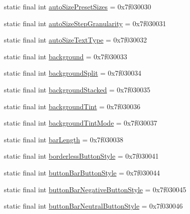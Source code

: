 \begin{DoxyCompactItemize}
\item 
static final int \mbox{\hyperlink{classandroid_1_1support_1_1v7_1_1appcompat_1_1_r_1_1attr_a560a07feaaba74f2673e11a6cd9030bb}{auto\+Size\+Preset\+Sizes}} = 0x7f030030
\item 
static final int \mbox{\hyperlink{classandroid_1_1support_1_1v7_1_1appcompat_1_1_r_1_1attr_a9842951e4e0a0f506950d576ed91a6bc}{auto\+Size\+Step\+Granularity}} = 0x7f030031
\item 
static final int \mbox{\hyperlink{classandroid_1_1support_1_1v7_1_1appcompat_1_1_r_1_1attr_a88e73eda0da576f10347ce50b6cf169e}{auto\+Size\+Text\+Type}} = 0x7f030032
\item 
static final int \mbox{\hyperlink{classandroid_1_1support_1_1v7_1_1appcompat_1_1_r_1_1attr_aa34b0a503c23c24f0398d3e089ef275d}{background}} = 0x7f030033
\item 
static final int \mbox{\hyperlink{classandroid_1_1support_1_1v7_1_1appcompat_1_1_r_1_1attr_ab1185b7b5fef8f7fda8589c4b5b6ae79}{background\+Split}} = 0x7f030034
\item 
static final int \mbox{\hyperlink{classandroid_1_1support_1_1v7_1_1appcompat_1_1_r_1_1attr_a422ecdbfe92076c90e055fcef81e6844}{background\+Stacked}} = 0x7f030035
\item 
static final int \mbox{\hyperlink{classandroid_1_1support_1_1v7_1_1appcompat_1_1_r_1_1attr_ac0cf5b18c785e17faa7ed5d7278a40d3}{background\+Tint}} = 0x7f030036
\item 
static final int \mbox{\hyperlink{classandroid_1_1support_1_1v7_1_1appcompat_1_1_r_1_1attr_a2f1e8050f64f463eb7cb319d9bf59a54}{background\+Tint\+Mode}} = 0x7f030037
\item 
static final int \mbox{\hyperlink{classandroid_1_1support_1_1v7_1_1appcompat_1_1_r_1_1attr_a68d79d306e3761cc1e98d20b818257e6}{bar\+Length}} = 0x7f030038
\item 
static final int \mbox{\hyperlink{classandroid_1_1support_1_1v7_1_1appcompat_1_1_r_1_1attr_ab831f8a19b2d8d4f77c6c3ceccdc96b2}{borderless\+Button\+Style}} = 0x7f030041
\item 
static final int \mbox{\hyperlink{classandroid_1_1support_1_1v7_1_1appcompat_1_1_r_1_1attr_aa196f9cbf296cc7813680d2dd4bd85ce}{button\+Bar\+Button\+Style}} = 0x7f030044
\item 
static final int \mbox{\hyperlink{classandroid_1_1support_1_1v7_1_1appcompat_1_1_r_1_1attr_aea5f5215fb29dd4730bf506287ee747f}{button\+Bar\+Negative\+Button\+Style}} = 0x7f030045
\item 
static final int \mbox{\hyperlink{classandroid_1_1support_1_1v7_1_1appcompat_1_1_r_1_1attr_a49c37663655fddb580c3b76e322d41ef}{button\+Bar\+Neutral\+Button\+Style}} = 0x7f030046

\end{DoxyCompactItemize}
